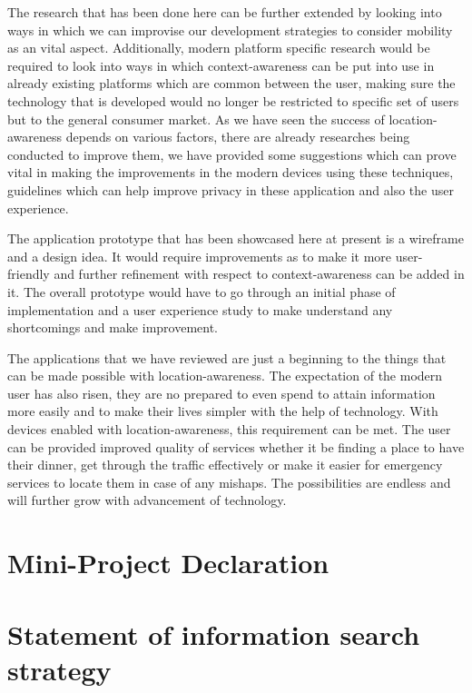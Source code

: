 \documentclass[12pt]{report}
\begin{document}
The research that has been done here can be further extended by looking into ways in which we can improvise our development strategies to consider mobility as an vital aspect. Additionally, modern platform specific research would be required to look into ways in which context-awareness can be put into use in already existing platforms which are common between the user, making sure the technology that is developed would no longer be restricted to specific set of users but to the general consumer market. As we have seen the success of location-awareness depends on various factors, there are already researches being conducted to improve them, we have provided some suggestions which can prove vital in making the improvements in the modern devices using these techniques, guidelines which can help improve privacy in these application and also the user experience. 

The application prototype that has been showcased here at present is a wireframe and a design idea. It would require improvements as to make it more user-friendly and further refinement with respect to context-awareness can be added in it. The overall prototype would have to go through an initial phase of implementation and a user experience study to make understand any shortcomings and make improvement.

The applications that we have reviewed are just a beginning to the things that can be made possible with location-awareness. The expectation of the modern user has also risen, they are no prepared to even spend to attain information more easily and to make their lives simpler with the help of technology. With devices enabled with location-awareness, this requirement can be met. The user can be provided improved quality of services whether it be finding a place to have their dinner, get through the traffic effectively or make it easier for emergency services to locate them in case of any mishaps. The possibilities are endless and will further grow with advancement of technology.



\appendix
\chapter{Mini-Project Declaration}


\chapter{Statement of information search strategy}
\end{document}
